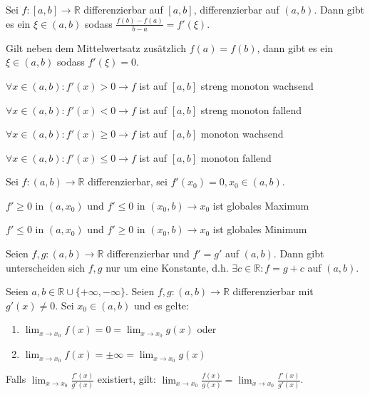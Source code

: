 \documentclass[]{article}
\begin{document}
\begin{satz}[Mittelwertsatz]
	Sei $f : [a,b] \rightarrow \mathbb{R}$ differenzierbar auf $[a,b]$, differenzierbar auf $(a,b)$. Dann gibt es ein $\xi \in (a,b)$ sodass $\frac{f(b) - f(a)}{b - a} = f'(\xi)$.
\end{satz}

\begin{satz}
	Gilt neben dem Mittelwertsatz zusätzlich $f(a) = f(b)$, dann gibt es ein $\xi \in (a,b)$ sodass $f'(\xi) = 0$.
\end{satz}

\begin{satz}
	\begin{description}[noitemsep]
		\item $\forall x\in(a,b) : f'(x) > 0 \rightarrow f$ ist auf $[a,b]$ streng monoton wachsend
		\item $\forall x\in(a,b) : f'(x) < 0 \rightarrow f$ ist auf $[a,b]$ streng monoton fallend
		\item $\forall x\in(a,b) : f'(x) \geq 0 \rightarrow f$ ist auf $[a,b]$ monoton wachsend
		\item $\forall x\in(a,b) : f'(x) \leq 0 \rightarrow f$ ist auf $[a,b]$ monoton fallend
	\end{description}
\end{satz}

\begin{satz}
	Sei $f : (a,b) \rightarrow \mathbb{R}$ differenzierbar, sei $f'(x_0) = 0, x_0 \in (a,b)$.
	\begin{description}[noitemsep]
		\item $f' \geq 0$ in $(a, x_0)$ und $f' \leq 0$ in $(x_0, b) \rightarrow x_0$ ist globales Maximum
		\item $f' \leq 0$ in $(a, x_0)$ und $f' \geq 0$ in $(x_0, b) \rightarrow x_0$ ist globales Minimum
	\end{description}
\end{satz}

\begin{satz}
	Seien $f,g :(a,b) \rightarrow \mathbb{R}$ differenzierbar und $f' = g'$ auf $(a,b)$. Dann gibt unterscheiden sich $f,g$ nur um eine Konstante, d.h. $\exists c \in \mathbb{R} : f = g + c$ auf $(a,b)$.
\end{satz}

\begin{satz}[L'Hospital]
	Seien $a,b \in \mathbb{R} \cup \{+ \infty, - \infty\}$. Seien $f, g : (a,b) \rightarrow \mathbb{R}$ differenzierbar mit $g'(x) \neq 0$. Sei $x_0 \in (a,b)$ und es gelte:
	\begin{enumerate}[noitemsep]
		\item $\lim_{x \rightarrow x_0} f(x) = 0 = \lim_{x \rightarrow x_0} g(x)$ oder
		\item$\lim_{x \rightarrow x_0} f(x) = \pm \infty = \lim_{x \rightarrow x_0} g(x)$
	\end{enumerate}
	Falls $\lim_{x \rightarrow x_0} \frac{f'(x)}{g'(x)}$ existiert, gilt: $\lim_{x \rightarrow x_0} \frac{f(x)}{g(x)} = \lim_{x \rightarrow x_0} \frac{f'(x)}{g'(x)}$.
\end{satz}
\end{document}

